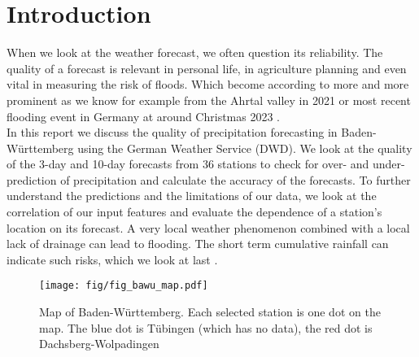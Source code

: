 \documentclass{article}
\theoremstyle{plain}
\theoremstyle{definition}
\theoremstyle{remark}
\begin{document}
\section{Introduction}\label{sec:intro}
When we look at the weather forecast, we often question its reliability. The
quality of a forecast is relevant in personal life, in agriculture planning and
even vital in measuring the risk of floods. Which become according to
\cite{FloodTrends} more and more prominent as we know for example from the
Ahrtal valley in 2021 \cite{pink} or most recent flooding event in Germany at
around Christmas 2023 \cite{flooding_christmas}. \\

In this report we discuss the quality of precipitation forecasting in
Baden-Württemberg using the German Weather Service (DWD).
We look at the quality of the 3-day and 10-day forecasts from 36 stations to
check for over- and under-prediction of precipitation and calculate the
accuracy of the forecasts.
To further understand the predictions and the limitations of our data, we look
at the correlation of our input features and evaluate the dependence of a
station's location on its forecast.
A very local weather phenomenon combined with a local lack of drainage can lead
to flooding. The short term cumulative rainfall can indicate such risks, which
we look at last \cite{pink}. %

\begin{figure}[h]
    \centering
    \label{fig:bw-stations}
    \texttt{[image: fig/fig\_bawu\_map.pdf]}
    \caption{Map of Baden-Württemberg. Each selected station is one dot on the
        map. The blue dot is Tübingen (which has no data), the red dot is
        Dachsberg-Wolpadingen}
\end{figure}
\end{document}
